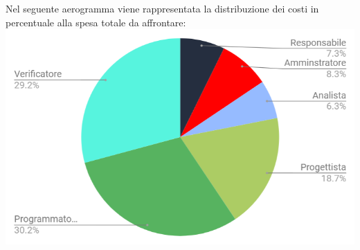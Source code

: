 \newpage
Nel seguente aerogramma viene rappresentata la distribuzione dei costi in percentuale alla spesa totale da affrontare:\\
\includegraphics[width=1\textwidth]{./src/Preventivo/src/img/TortaPrevCompleto.png}


